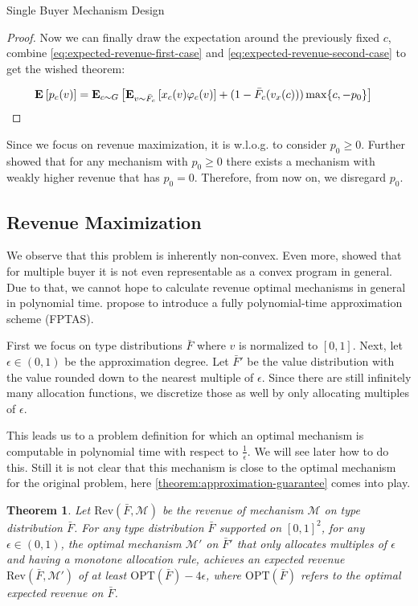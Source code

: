 \documentclass[11pt,a4paper]{article}
\newtheorem{theorem}{Theorem}
\newcommand{\Ex}[2][]{\mbox{\rm\bf E}_{#1}\left[#2\right]}
\newcommand{\1}[1]{\mbox{\rm\bf 1}_{#1}}
\begin{document}
\begin{section}{Single Buyer Mechanism Design}
\begin{proof}
     Now we can finally draw the expectation around the previously fixed $c$, combine \autoref{eq:expected-revenue-first-case} and \autoref{eq:expected-revenue-second-case} to get the wished theorem:

     \begin{align*}
         \Ex{p_c(v)} & = \Ex[c \sim G]{\Ex[v \sim \bar{F}_c]{x_c(v) \varphi_c(v)} + (1 - \bar{F}_{c}(v_x(c))) \max\{c, -p_0\} }
     \end{align*}
 \end{proof}

 Since we focus on revenue maximization, it is w.l.o.g. to consider $p_0 \geq 0$.
 Further \citet{primary} showed that for any mechanism with $p_0 \geq 0$ there exists a mechanism with weakly higher revenue that has $p_0 = 0$.
 Therefore, from now on, we disregard $p_0$.

 \subsection{Revenue Maximization}
 \label{sec:revenue-maximization}

 We observe that this problem is inherently non-convex.
 Even more, \citet{primary} showed that for multiple buyer it is not even representable as a convex program in general.
 Due to that, we cannot hope to calculate revenue optimal mechanisms in general in polynomial time.
 \citet{primary} propose to introduce a fully polynomial-time approximation scheme (FPTAS).

 First we focus on type distributions $\bar{F}$ where $v$ is normalized to $[0,1]$.
 Next, let $\epsilon \in (0, 1)$ be the approximation degree.
 Let $\bar{F}'$ be the value distribution with the value rounded down to the nearest multiple of $\epsilon$.
 Since there are still infinitely many allocation functions, we discretize those as well by only allocating multiples of $\epsilon$.

 This leads us to a problem definition for which an optimal mechanism is computable in polynomial time with respect to $\frac{1}{\epsilon}$.
 We will see later how to do this.
 Still it is not clear that this mechanism is close to the optimal mechanism for the original problem, here \autoref{theorem:approximation-guarantee} comes into play.

 \begin{theorem}
     \label{theorem:approximation-guarantee}
     Let $\mathrm{Rev}(\bar{F}, \mathcal{M})$ be the revenue of mechanism $\mathcal{M}$ on type distribution $\bar{F}$.
     For any type distribution $\bar{F}$ supported on $[0,1]^2$, for any $\epsilon \in (0,1)$,
     the optimal mechanism $\mathcal{M}'$ on $\bar{F}'$ that only allocates multiples of $\epsilon$ and having a monotone allocation rule, achieves an expected revenue $\mathrm{Rev}(\bar{F},\mathcal{M}')$ of at least
     $\mathrm{OPT}(\bar{F}) - 4\epsilon$, where $\mathrm{OPT}(\bar{F})$ refers to the optimal expected revenue on $\bar{F}$.
 \end{theorem}


\end{section}
\end{document}

